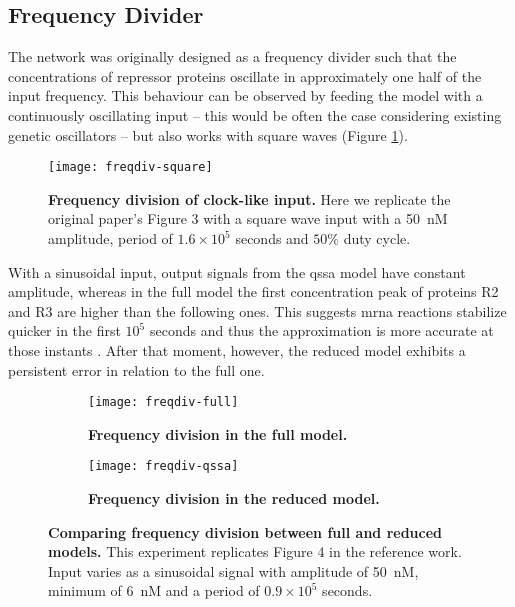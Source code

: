   \subsection{Frequency Divider}\label{sec:freq-div}

    The network was originally designed as a frequency divider such that the concentrations of repressor proteins oscillate in approximately one half of the input frequency.
    This behaviour can be observed by feeding the model with a continuously oscillating input -- this would be often the case considering existing genetic oscillators \cite{optoscillator} -- but also works with square waves (Figure \ref{fig:freqdiv-square}).

    \begin{figure}[!htb]
      \centering
      \texttt{[image: freqdiv-square]}
      \caption{\textbf{Frequency division of clock-like input.} Here we replicate the original paper's Figure 3 with a square wave input with a \SI{50}{\nano M} amplitude, period of $1.6 \times 10^5$ seconds and $50\%$ duty cycle.}
      \label{fig:freqdiv-square}
    \end{figure}

    With a sinusoidal input, output signals from the \ac{qssa} model have constant amplitude, whereas in the full model the first concentration peak of proteins R2 and R3 are higher than the following ones.
    This suggests \acs{mrna} reactions stabilize quicker in the first $10^5$ seconds and thus the approximation is more accurate at those instants \cite{ingalls}.
    After that moment, however, the reduced model exhibits a persistent error in relation to the full one.

    \begin{figure}[!htb]
      \centering
      \begin{subfigure}[t]{0.75\textwidth}
        \centering
        \texttt{[image: freqdiv-full]}
        \caption{\textbf{Frequency division in the full model.}}
        \label{fig:freqdiv-full}
      \end{subfigure}
      \begin{subfigure}[t]{0.75\textwidth}
        \centering
        \texttt{[image: freqdiv-qssa]}
        \caption{\textbf{Frequency division in the reduced model.}}
        \label{fig:freqdiv-qssa}
      \end{subfigure}
      \caption{\textbf{Comparing frequency division between full and reduced models.} This experiment replicates Figure 4 in the reference work. Input varies as a sinusoidal signal with amplitude of \SI{50}{\nano M}, minimum of \SI{6}{\nano M} and a period of $0.9 \times 10^5$ seconds.}
      \label{fig:freqdiv-sine}
    \end{figure}

